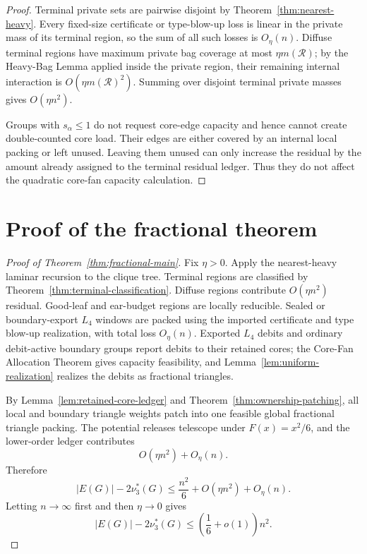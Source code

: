 \documentclass[11pt]{article}
\theoremstyle{definition}
\newcommand{\calR}{\mathcal R}
\begin{document}
\begin{proof}
Terminal private sets are pairwise disjoint by Theorem~\ref{thm:nearest-heavy}. Every fixed-size certificate or type-blow-up loss is linear in the private mass of its terminal region, so the sum of all such losses is \(O_\eta(n)\). Diffuse terminal regions have maximum private bag coverage at most \(\eta m(\calR)\); by the Heavy-Bag Lemma applied inside the private region, their remaining internal interaction is \(O(\eta m(\calR)^2)\). Summing over disjoint terminal private masses gives \(O(\eta n^2)\).

Groups with \(s_\alpha\le1\) do not request core-edge capacity and hence cannot create double-counted core load. Their edges are either covered by an internal local packing or left unused. Leaving them unused can only increase the residual by the amount already assigned to the terminal residual ledger. Thus they do not affect the quadratic core-fan capacity calculation.
\end{proof}

\section{Proof of the fractional theorem}

\begin{proof}[Proof of Theorem~\ref{thm:fractional-main}]
Fix \(\eta>0\). Apply the nearest-heavy laminar recursion to the clique tree. Terminal regions are classified by Theorem~\ref{thm:terminal-classification}. Diffuse regions contribute \(O(\eta n^2)\) residual. Good-leaf and ear-budget regions are locally reducible. Sealed or boundary-export \(L_4\) windows are packed using the imported certificate and type blow-up realization, with total loss \(O_\eta(n)\). Exported \(L_4\) debits and ordinary debit-active boundary groups report debits to their retained cores; the Core-Fan Allocation Theorem gives capacity feasibility, and Lemma~\ref{lem:uniform-realization} realizes the debits as fractional triangles.

By Lemma~\ref{lem:retained-core-ledger} and Theorem~\ref{thm:ownership-patching}, all local and boundary triangle weights patch into one feasible global fractional triangle packing. The potential releases telescope under \(F(x)=x^2/6\), and the lower-order ledger contributes
\[
    O(\eta n^2)+O_\eta(n).
\]
Therefore
\[
    |E(G)|-2\nu_3^*(G)
    \le
    \frac{n^2}{6}+O(\eta n^2)+O_\eta(n).
\]
Letting \(n\to\infty\) first and then \(\eta\to0\) gives
\[
    |E(G)|-2\nu_3^*(G)
    \le
    \left(\frac16+o(1)\right)n^2.
\]
\end{proof}
\end{document}
